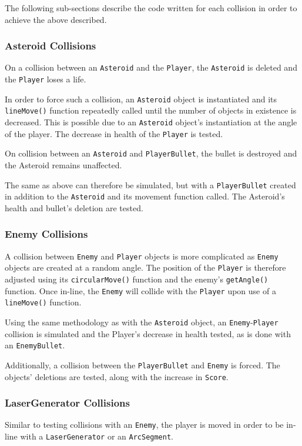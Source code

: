 \documentclass[10pt,twocolumn]{witseiepaper}
\begin{document}
The following sub-sections describe the code written for each collision in order to achieve the above described.
\subsubsection{Asteroid Collisions}
On a collision between an \texttt{Asteroid} and the \texttt{Player}, the \texttt{Asteroid} is deleted and the \texttt{Player} loses a life. 

In order to force such a collision, an \texttt{Asteroid} object is instantiated and its \texttt{lineMove()} function repeatedly called until the number of objects in existence is decreased. This is possible due to an \texttt{Asteroid} object's instantiation at the angle of the player. The decrease in health of the \texttt{Player} is tested.

On collision between an \texttt{Asteroid} and \texttt{PlayerBullet}, the bullet is destroyed and the Asteroid remains unaffected.

The same as above can therefore be simulated, but with a \texttt{PlayerBullet} created in addition to the \texttt{Asteroid} and its movement function called. The Asteroid's health and bullet's deletion are tested.
\subsubsection{Enemy Collisions}
A collision between \texttt{Enemy} and \texttt{Player} objects is more complicated as \texttt{Enemy} objects are created at a random angle. The position of the \texttt{Player} is therefore adjusted using its \texttt{circularMove()} function and the enemy's \texttt{getAngle()} function. Once in-line, the \texttt{Enemy} will collide with the \texttt{Player} upon use of a \texttt{lineMove()} function.

Using the same methodology as with the \texttt{Asteroid} object, an \texttt{Enemy}-\texttt{Player} collision is simulated and the Player's decrease in health tested, as is done with an \texttt{EnemyBullet}.

Additionally, a collision between the \texttt{PlayerBullet} and \texttt{Enemy} is forced. The objects' deletions are tested, along with the increase in \texttt{Score}.
\subsubsection{LaserGenerator Collisions}
Similar to testing collisions with an \texttt{Enemy}, the player is moved in order to be in-line with a \texttt{LaserGenerator} or an \texttt{ArcSegment}. 
\end{document}
